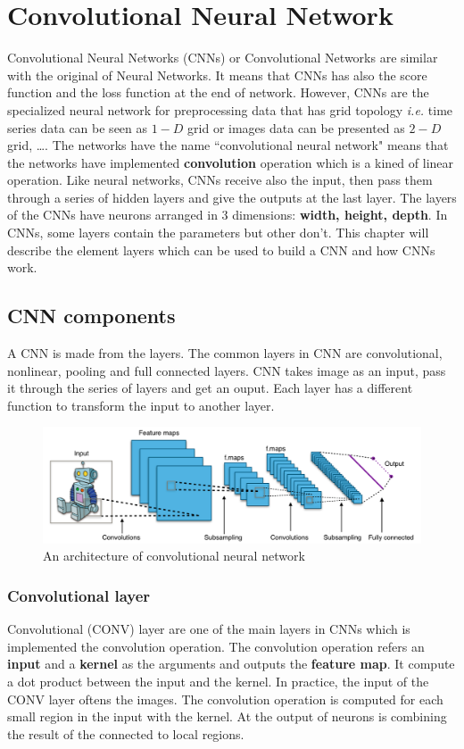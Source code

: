 \chapter{Convolutional Neural Network}
Convolutional Neural Networks (CNNs) or Convolutional Networks are similar with the original of Neural Networks. It means that CNNs has also the score function and the loss function at the end of network. However, CNNs are the specialized neural network for preprocessing data that has grid topology \textit{i.e.} time series data can be seen as $1-D$ grid or images data can be presented as $2-D$ grid, \ldots. The networks have the name ``convolutional neural network" means that the networks have implemented \textbf{convolution} operation which is a kined of linear operation. Like neural networks, CNNs receive also the input, then pass them through a series of hidden layers and give the outputs at the last layer. The layers of the CNNs have neurons arranged in 3 dimensions: \textbf{width, height, depth}. In CNNs, some layers contain the parameters but other don't. This chapter will describe the element layers which can be used to build a CNN and how CNNs work.

\section{CNN components}

A CNN is made from the layers. The common layers in CNN are convolutional, nonlinear, pooling and full connected layers. CNN takes image as an input, pass it through the series of layers and get an ouput. Each layer has a different function to transform the input to another layer. 
\begin{figure}[h]
	\centering
	\includegraphics[scale=0.45]{images/cnn_architecture}
	\caption{An architecture of convolutional neural network}
	\label{figlncex}
\end{figure}

\subsection{Convolutional layer}
Convolutional (CONV) layer are one of the main layers in CNNs which is implemented the convolution operation. The convolution operation refers an \textbf{input} and a \textbf{kernel} as the arguments and outputs the \textbf{feature map}. It compute a dot product between the input and the kernel. In practice, the input of the CONV layer oftens the images. The convolution operation is computed for each small region in the input with the kernel. At the output of neurons is combining the result of the connected to local regions.

